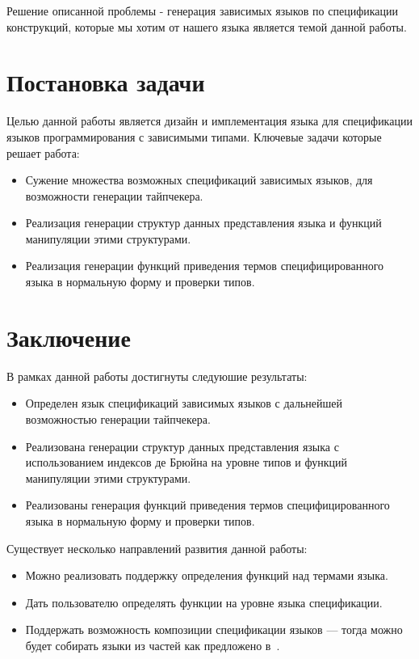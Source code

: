 \documentclass{spbau-diploma}
\begin{document}
Решение описанной проблемы - генерация зависимых языков по спецификации конструкций, которые мы хотим от нашего языка является темой данной работы.

\section{Постановка задачи}

Целью данной работы является дизайн и имплементация языка для спецификации языков программирования с зависимыми типами. Ключевые задачи которые решает работа:
\begin{itemize}
  \item Сужение множества возможных спецификаций зависимых языков, для возможности генерации тайпчекера.
  \item Реализация генерации структур данных представления языка и функций манипуляции этими структурами.
  \item Реализация генерации функций приведения термов специфицированного языка в нормальную форму и проверки типов.
\end{itemize}






\section*{Заключение}

В рамках данной работы достигнуты следуюшие результаты:
\begin{itemize}
  \item Определен язык спецификаций зависимых языков с дальнейшей возможностью генерации тайпчекера.
  \item Реализована генерации структур данных представления языка с использованием индексов де Брюйна на уровне типов и функций манипуляции этими структурами.
  \item Реализованы генерация функций приведения термов специфицированного языка в нормальную форму и проверки типов.
\end{itemize}

Существует несколько направлений развития данной работы:
\begin{itemize}
  \item Можно реализовать поддержку определения функций над термами языка.
  \item Дать пользователю определять функции на уровне языка спецификации.
  \item Поддержать возможность композиции спецификации языков --- тогда можно будет собирать языки из частей как предложено в~\cite{isaev}.
\end{itemize}






\end{document}
